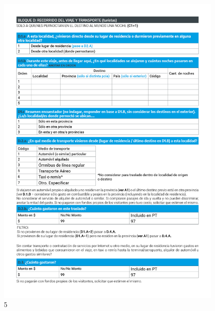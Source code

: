 \documentclass[
]{book}
\begin{document}
\begin{figure}

{\centering \includegraphics[width=1\linewidth]{imagenes/graf05} 

}

\caption{5}\label{fig:005}
\end{figure}
\end{document}

